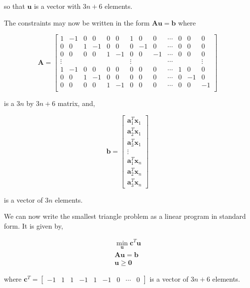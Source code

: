 \documentclass{article}
\begin{document}
\noindent so that $\mathbf{u}$ is a vector with $3n + 6$ elements.

The constraints may now be written in the form $\mathbf{A} \mathbf{u} = \mathbf{b}$ where

\begin{equation}
\mathbf{A} = \left[ \begin{smallmatrix}
1 & -1 & 0 & 0 & 0 & 0 & 1 & 0 & 0 & \cdots & 0 & 0 & 0\\
0 & 0 & 1 & -1 & 0 & 0 & 0 & -1 & 0 & \cdots & 0 & 0 & 0\\
0 & 0 & 0 & 0 & 1 & -1 & 0 & 0 & -1 & \cdots & 0 & 0 & 0\\
\vdots & & & & & & \vdots & & & \cdots & & & \vdots\\
1 & -1 & 0 & 0 & 0 & 0 & 0 & 0 & 0 & \cdots & 1 & 0 & 0\\
0 & 0 & 1 & -1 & 0 & 0 & 0 & 0 & 0 & \cdots & 0 & -1 & 0\\
0 & 0 & 0 & 0 & 1 & -1 & 0 & 0 & 0 & \cdots & 0 & 0 & -1\\
\end{smallmatrix} \right]
\end{equation}

\noindent is a $3n$ by $3n+6$ matrix, and,

\begin{equation}
\mathbf{b} = \begin{bmatrix}
\mathbf{a}^T_1 \mathbf{x}_1\\
\mathbf{a}^T_2 \mathbf{x}_1\\
\mathbf{a}^T_3 \mathbf{x}_1\\
\vdots\\
\mathbf{a}^T_1 \mathbf{x}_n\\
\mathbf{a}^T_2 \mathbf{x}_n\\
\mathbf{a}^T_3 \mathbf{x}_n
\end{bmatrix}
\end{equation}

\noindent is a vector of $3n$ elements.

We can now write the smallest triangle problem as a linear program in standard form. It is given by,

\begin{eqnarray*}
\min_\mathbf{u} \mathbf{c}^T \mathbf{u}\\
\mathbf{A} \mathbf{u} = \mathbf{b}\\
\mathbf{u} \ge \mathbf{0}
\end{eqnarray*}

\noindent where $\mathbf{c}^T = \begin{bmatrix}-1 & 1 & 1 & -1 & 1 & -1 & 0 & \cdots & 0\end{bmatrix}$ is a vector of $3n + 6$ elements.
\end{document}

